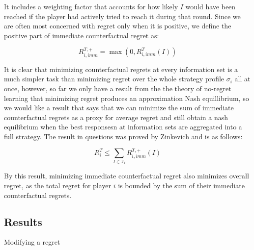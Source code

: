 \documentclass{article}
\begin{document}
It includes a weighting factor that accounts for how likely $I$ would have been reached if the player had actively tried to reach it during that round. Since we are often most concerned with regret only when it is positive, we define the positive part of immediate counterfactual regret as:

\[ R_{i,imm}^{T,+} = \max(0, R_{i,imm}^T(I)) \]


It is clear that minimizing counterfactual regrets at every information set is a much simpler task than minimizing regret over the whole strategy profile $\sigma_i$ all at once, however, so far we only have a result from the the theory of no-regret learning that minimizing regret produces an approximation Nash equillibrium, so we would like a result that says that we can minimize the sum of immediate counterfactual regrets as a proxy for average regret and still obtain a nash equilibrium when the best responsesn at information sets are aggregated into a full strategy. The result in questions was proved by Zinkevich and is as follows:

\[ R^T_i \leq \sum_{I \in \mathcal{I}_i} R_{i,imm}^{T,+}(I) \]

By this result, minimizing immediate counterfactual regret also minimizes overall regret, as the total regret for player $i$ is bounded by the sum of their immediate counterfactual regrets.


\subsection{Results}
Modifying a regret
\end{document}
